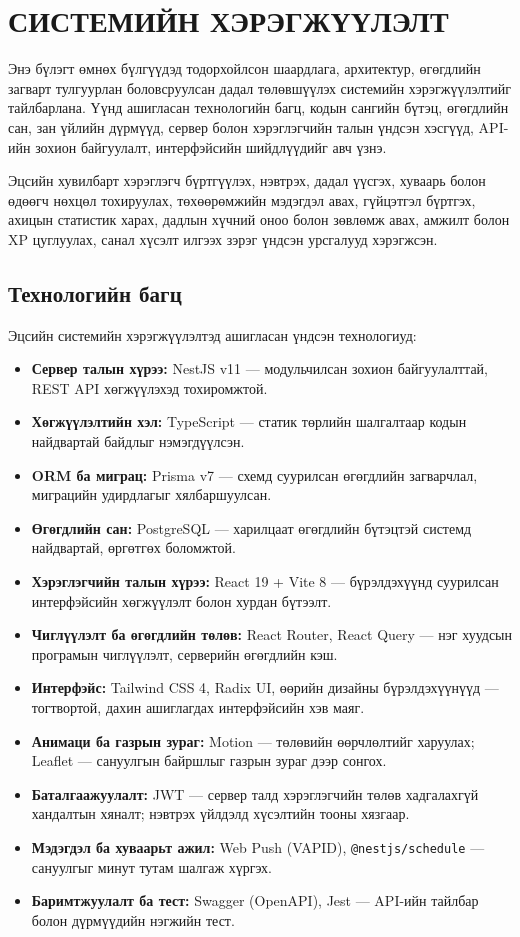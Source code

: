 \chapter{СИСТЕМИЙН ХЭРЭГЖҮҮЛЭЛТ}

Энэ бүлэгт өмнөх бүлгүүдэд тодорхойлсон шаардлага, архитектур, өгөгдлийн загварт тулгуурлан боловсруулсан дадал төлөвшүүлэх системийн хэрэгжүүлэлтийг тайлбарлана. Үүнд ашигласан технологийн багц, кодын сангийн бүтэц, өгөгдлийн сан, зан үйлийн дүрмүүд, сервер болон хэрэглэгчийн талын үндсэн хэсгүүд, API-ийн зохион байгуулалт, интерфэйсийн шийдлүүдийг авч үзнэ.

Эцсийн хувилбарт хэрэглэгч бүртгүүлэх, нэвтрэх, дадал үүсгэх, хуваарь болон өдөөгч нөхцөл тохируулах, төхөөрөмжийн мэдэгдэл авах, гүйцэтгэл бүртгэх, ахицын статистик харах, дадлын хүчний оноо болон зөвлөмж авах, амжилт болон XP цуглуулах, санал хүсэлт илгээх зэрэг үндсэн урсгалууд хэрэгжсэн.

\section{Технологийн багц}

Эцсийн системийн хэрэгжүүлэлтэд ашигласан үндсэн технологиуд:

\begin{itemize}
  \item \textbf{Сервер талын хүрээ:} NestJS v11 --- модульчилсан зохион байгуулалттай, REST API хөгжүүлэхэд тохиромжтой.
  \item \textbf{Хөгжүүлэлтийн хэл:} TypeScript --- статик төрлийн шалгалтаар кодын найдвартай байдлыг нэмэгдүүлсэн.
  \item \textbf{ORM ба миграц:} Prisma v7 --- схемд суурилсан өгөгдлийн загварчлал, миграцийн удирдлагыг хялбаршуулсан.
  \item \textbf{Өгөгдлийн сан:} PostgreSQL --- харилцаат өгөгдлийн бүтэцтэй системд найдвартай, өргөтгөх боломжтой.
  \item \textbf{Хэрэглэгчийн талын хүрээ:} React 19 + Vite 8 --- бүрэлдэхүүнд суурилсан интерфэйсийн хөгжүүлэлт болон хурдан бүтээлт.
  \item \textbf{Чиглүүлэлт ба өгөгдлийн төлөв:} React Router, React Query --- нэг хуудсын програмын чиглүүлэлт, серверийн өгөгдлийн кэш.
  \item \textbf{Интерфэйс:} Tailwind CSS 4, Radix UI, өөрийн дизайны бүрэлдэхүүнүүд --- тогтвортой, дахин ашиглагдах интерфэйсийн хэв маяг.
  \item \textbf{Анимаци ба газрын зураг:} Motion --- төлөвийн өөрчлөлтийг харуулах; Leaflet --- сануулгын байршлыг газрын зураг дээр сонгох.
  \item \textbf{Баталгаажуулалт:} JWT --- сервер талд хэрэглэгчийн төлөв хадгалахгүй хандалтын хяналт; нэвтрэх үйлдэлд хүсэлтийн тооны хязгаар.
  \item \textbf{Мэдэгдэл ба хуваарьт ажил:} Web Push (VAPID), \texttt{@nestjs/schedule} --- сануулгыг минут тутам шалгаж хүргэх.
  \item \textbf{Баримтжуулалт ба тест:} Swagger (OpenAPI), Jest --- API-ийн тайлбар болон дүрмүүдийн нэгжийн тест.
\end{itemize}

